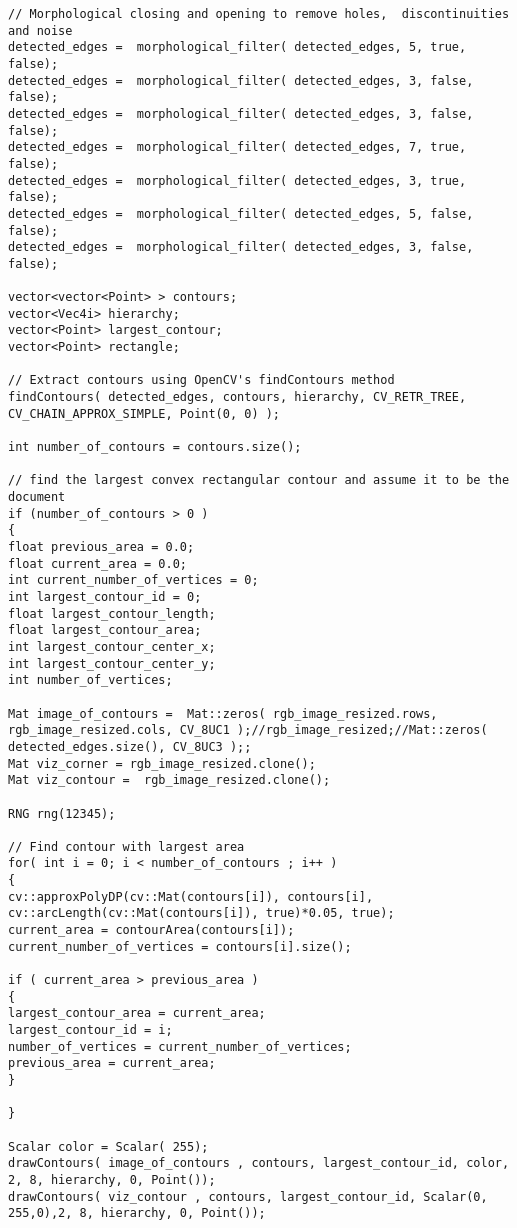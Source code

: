 \begin{lstlisting}
// Morphological closing and opening to remove holes,  discontinuities and noise
detected_edges =  morphological_filter( detected_edges, 5, true, false);
detected_edges =  morphological_filter( detected_edges, 3, false, false);
detected_edges =  morphological_filter( detected_edges, 3, false, false);
detected_edges =  morphological_filter( detected_edges, 7, true, false);
detected_edges =  morphological_filter( detected_edges, 3, true, false);
detected_edges =  morphological_filter( detected_edges, 5, false, false);
detected_edges =  morphological_filter( detected_edges, 3, false, false);

vector<vector<Point> > contours;
vector<Vec4i> hierarchy;
vector<Point> largest_contour;
vector<Point> rectangle;

// Extract contours using OpenCV's findContours method
findContours( detected_edges, contours, hierarchy, CV_RETR_TREE, CV_CHAIN_APPROX_SIMPLE, Point(0, 0) );

int number_of_contours = contours.size();

// find the largest convex rectangular contour and assume it to be the document
if (number_of_contours > 0 )
{
float previous_area = 0.0;
float current_area = 0.0;
int current_number_of_vertices = 0;
int largest_contour_id = 0;
float largest_contour_length;
float largest_contour_area;
int largest_contour_center_x;
int largest_contour_center_y;
int number_of_vertices;          

Mat image_of_contours =  Mat::zeros( rgb_image_resized.rows, rgb_image_resized.cols, CV_8UC1 );//rgb_image_resized;//Mat::zeros( detected_edges.size(), CV_8UC3 );;
Mat viz_corner = rgb_image_resized.clone();
Mat viz_contour =  rgb_image_resized.clone();

RNG rng(12345);

// Find contour with largest area
for( int i = 0; i < number_of_contours ; i++ )
{ 
cv::approxPolyDP(cv::Mat(contours[i]), contours[i], cv::arcLength(cv::Mat(contours[i]), true)*0.05, true);
current_area = contourArea(contours[i]);
current_number_of_vertices = contours[i].size();

if ( current_area > previous_area )
{
largest_contour_area = current_area;
largest_contour_id = i;
number_of_vertices = current_number_of_vertices;	
previous_area = current_area;	
}

}

Scalar color = Scalar( 255);
drawContours( image_of_contours , contours, largest_contour_id, color, 2, 8, hierarchy, 0, Point());
drawContours( viz_contour , contours, largest_contour_id, Scalar(0, 255,0),2, 8, hierarchy, 0, Point());	


\end{lstlisting}

